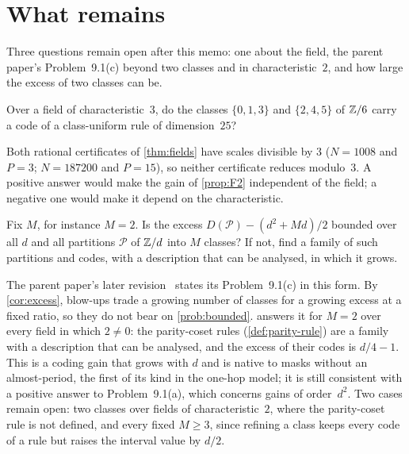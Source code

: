 \section{What remains}\label{sec:open}

Three questions remain open after this memo: one about the field, the parent paper's Problem~9.1(c) beyond two classes
and in characteristic~$2$, and how large the excess of two classes can be.

\begin{problem}\label{prob:char3}
Over a field of characteristic~$3$, do the classes $\{0,1,3\}$ and $\{2,4,5\}$ of $\mathbb{Z}/6$ carry a code of a
class-uniform rule of dimension~$25$?
\end{problem}

Both rational certificates of \cref{thm:fields} have scales divisible by $3$ ($N=1008$ and $P=3$; $N=187200$ and
$P=15$), so neither certificate reduces modulo~$3$. A positive answer would make the gain of \cref{prop:F2} independent
of the field; a negative one would make it depend on the characteristic.

\begin{problem}\label{prob:bounded}
Fix $M$, for instance $M=2$. Is the excess $D(\mathcal P)-(d^2+Md)/2$ bounded over all $d$ and all partitions
$\mathcal P$ of $\mathbb{Z}/d$ into $M$ classes? If not, find a family of such partitions and codes, with a description that
can be analysed, in which it grows.
\end{problem}

The parent paper's later revision~\cite{SeventeenthPaperRevised2026} states its Problem~9.1(c) in this form. By
\cref{cor:excess}, blow-ups trade a growing number of classes for a growing excess at a fixed ratio, so they do not
bear on \cref{prob:bounded}.  answers it for $M=2$ over every field in which $2\ne0$: the
parity-coset rules (\cref{def:parity-rule}) are a family with a description that can be analysed, and the excess of
their codes is $d/4-1$. This is a coding gain that grows with $d$ and is native to masks without an almost-period, the
first of its kind in the one-hop model; it is still consistent with a positive answer to Problem~9.1(a), which
concerns gains of order~$d^2$. Two cases remain open: two classes over fields of characteristic~$2$, where the
parity-coset rule is not defined, and every fixed $M\ge3$, since refining a class keeps every code of a rule but raises
the interval value by $d/2$.

